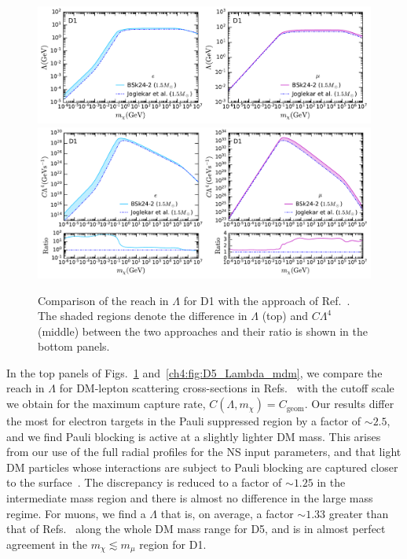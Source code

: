 \begin{figure}[t!bp]
    \centering
    \includegraphics[width=\textwidth]{capture_2/D1_Lambda_mdm_leptons.pdf}\\
    \vspace*{-0.5em}    
    \includegraphics[width=\textwidth]{capture_2/D1_C_mdm_leptons.pdf}     
    \caption[Comparison of the reach in $\Lambda$ for D1 with the approach of Ref.~\cite{Joglekar:2020liw_Darkkineticheating}. ]{Comparison of the reach in $\Lambda$ for D1 with the approach of Ref.~\cite{Joglekar:2020liw_Darkkineticheating}. The shaded regions denote the difference in $\Lambda$ (top) and $C\Lambda^4$ (middle) between the two approaches and their ratio is shown in the bottom panels.}
    \label{ch4:fig:D1_Lambda_mdm}
\end{figure}


    
In the top panels of Figs.~\ref{ch4:fig:D1_Lambda_mdm} and~\ref{ch4:fig:D5_Lambda_mdm}, we compare the reach in $\Lambda$ for DM-lepton scattering cross-sections in Refs.~\cite{Joglekar:2019vzy_sep_Relativisticcapturedark,Joglekar:2020liw_Darkkineticheating} with the cutoff scale we obtain for the maximum capture rate, $C(\Lambda,m_\chi)=C_\mathrm{geom}$. 
Our results differ the most for electron targets in the Pauli suppressed region by a factor of $\sim 2.5$, and we find Pauli blocking is active at a slightly lighter DM mass. This arises from our use of the full radial profiles for the NS input parameters, and that light DM particles whose interactions are subject to Pauli blocking are captured closer to the surface~\cite{Bell:2020jou_sep_ImprovedTreatmentDark}. The discrepancy is reduced to a factor of  $\sim 1.25$ in the intermediate mass region and there is almost no difference in the large mass regime. For muons, we find a $\Lambda$ that is, on average, a factor $\sim 1.33$ greater than that of Refs.~\cite{Joglekar:2019vzy_sep_Relativisticcapturedark,Joglekar:2020liw_Darkkineticheating} along the whole DM mass range for D5,  and is in almost perfect agreement in the $m_\chi\lesssim m_\mu$ region for D1. 


